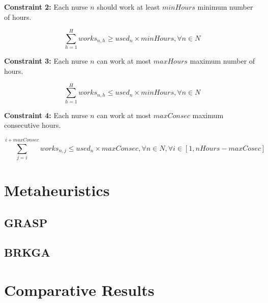 \documentclass{article}
\newcommand\tab[1][1cm]{\hspace*{#1}}
\begin{document}
\begin{minipage}{\linewidth}
\tab\caption{\textbf{Constraint 2:} Each nurse $n$ should work at least $minHours$ minimum number of hours.}
	\begin{equation}
		\sum_{h=1}^H works_{n,h} \geq used_n \times minHours, \forall n \in N
	\end{equation}
\end{minipage}

\begin{minipage}{\linewidth}
\tab\caption{\textbf{Constraint 3:} Each nurse $n$ can work at most $maxHours$ maximum number of hours.}
	\begin{equation}
		\sum_{h=1}^H works_{n,h} \leq used_n \times minHours, \forall n \in N
	\end{equation}
\end{minipage}

\begin{minipage}{\linewidth}
\tab\caption{\textbf{Constraint 4:} Each nurse $n$ can work at most $maxConsec$ maximum consecutive hours.}
	\begin{equation}
		\sum_{j=i}^{i+maxConsec} works_{n,j} \leq used_n \times maxConsec, \forall n \in N, \forall i \in [1,nHours-maxCosec]
	\end{equation}
\end{minipage}

	\section{Metaheuristics}
	\subsection{GRASP}
	\subsection{BRKGA}
	\section{Comparative Results}
\end{document}
